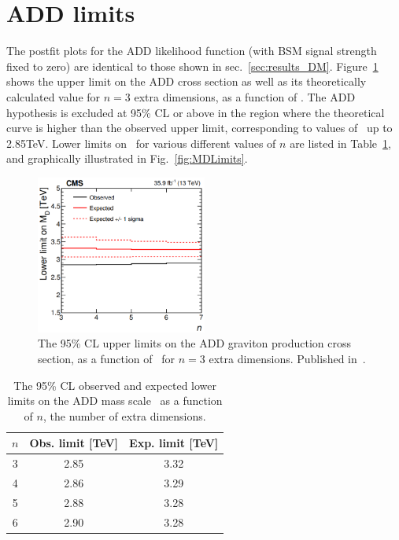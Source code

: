 \section{ADD limits} \label{sec:results_ADD}
The postfit plots for the ADD likelihood function (with BSM signal strength fixed to zero) are identical
to those shown in sec.~\ref{sec:results_DM}. Figure~\ref{fig:ADDLimits} shows the upper limit on the ADD cross section as well as its
theoretically calculated value for $n=3$ extra dimensions, as a function of \mD. The ADD hypothesis is excluded at 95\% CL or above in the region
where the theoretical curve is higher than the observed upper limit, corresponding to values of \mD\ up to 2.85\unit{TeV}.
Lower limits on \mD\ for various different values of $n$ are listed in Table~\ref{tab:MDLimits}, and graphically illustrated in Fig.~\ref{fig:MDLimits}.

\begin{figure}[htbp]
  \begin{center}
    \includegraphics[width=0.5\textwidth]{figures/exo16053/add.png}
    \caption{The 95\% CL upper limits on the ADD graviton production cross section, as a function of \mD\, for $n=3$ extra dimensions.
    Published in~\cite{ref:JHEP02(2019)074}.}
    \label{fig:ADDLimits}
  \end{center}
\end{figure}

\begin{table}[htbp]
  \begin{center}
    \label{tab:MDLimits}
    \begin{tabular}{|c|c|c|}
      \hline
      $n$ & Obs. limit [TeV] & Exp. limit [TeV] \\
      \hline
      3 & 2.85 & 3.32 \\
      4 & 2.86 & 3.29 \\
      5 & 2.88 & 3.28\\
      6 & 2.90 & 3.28 \\
      \hline
    \end{tabular}
    \caption{The 95\% CL observed and expected lower limits on the ADD mass scale \mD\ as a function of $n$, the number of extra dimensions.}
  \end{center}
\end{table}

